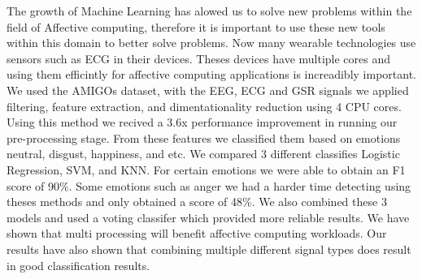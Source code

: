 The growth of Machine Learning has alowed us to solve new
problems within the field of Affective computing,
therefore it is important to use these new tools within this
domain to better solve problems.
Now many wearable technologies use sensors such as ECG in their devices.
Theses devices have multiple cores and using them efficintly for
affective computing applications is increadibly important.
We used the AMIGOs dataset, with the EEG, ECG and GSR signals
we applied filtering, feature extraction, and dimentationality reduction
using 4 CPU cores.
Using this method we recived a 3.6x performance improvement in running our
pre-processing stage.
From these features we classified them based on emotions
neutral, disgust, happiness, and etc.
We compared 3 different classifies Logistic Regression,
SVM, and KNN.
For certain emotions we were able to obtain an F1 score of 90\%.
Some emotions such as anger we had a harder time detecting
using theses methods and only obtained a score of 48\%.
We also combined these 3 models and used a voting classifer which provided
more reliable results.
We have shown that multi processing will benefit affective computing workloads.
Our results have also shown that combining multiple different signal types does
result in good classification results.

